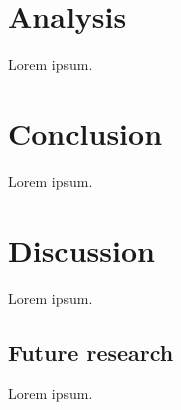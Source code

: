 \documentclass{scrreprt}
\begin{document}
\chapter{Analysis}
Lorem ipsum.





\chapter{Conclusion}
Lorem ipsum.





\chapter{Discussion}
Lorem ipsum.

\section{Future research}
Lorem ipsum.
\end{document}
